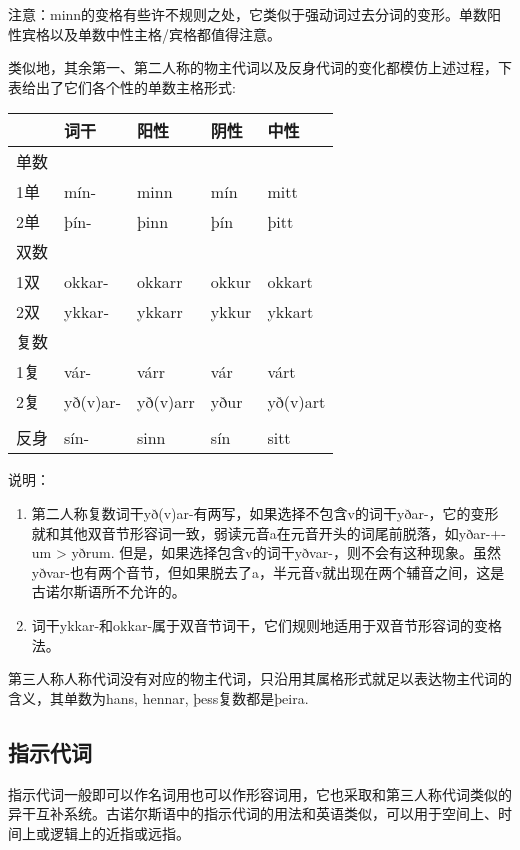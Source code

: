 注意：minn的变格有些许不规则之处，它类似于强动词过去分词的变形。单数阳性宾格以及单数中性主格/宾格都值得注意。

类似地，其余第一、第二人称的物主代词以及反身代词的变化都模仿上述过程，下表给出了它们各个性的单数主格形式:

\begin{longtable}{lllll}
\toprule
 & 词干 & 阳性 & 阴性 & 中性 \\
\midrule
\endhead
\bottomrule
\endfoot
单数 & & & & \\
1单 & mín- & minn & mín & mitt \\
2单 & þín- & þinn & þín & þitt \\
双数 & & & & \\
1双 & okkar- & okkarr & okkur & okkart \\
2双 & ykkar- & ykkarr & ykkur & ykkart \\
复数 & & & & \\
1复 & vár- & várr & vár & várt \\
2复 & yð(v)ar- & yð(v)arr & yður & yð(v)art \\
& & & & \\
反身 & sín- & sinn & sín & sitt \\
\end{longtable}

说明：

\begin{enumerate}
\def\labelenumi{\arabic{enumi})}
\item
  第二人称复数词干yð(v)ar-有两写，如果选择不包含v的词干yðar-，它的变形就和其他双音节形容词一致，弱读元音a在元音开头的词尾前脱落，如yðar-+-um
  \textgreater{} yðrum.
  但是，如果选择包含v的词干yðvar-，则不会有这种现象。虽然yðvar-也有两个音节，但如果脱去了a，半元音v就出现在两个辅音之间，这是古诺尔斯语所不允许的。
\item
  词干ykkar-和okkar-属于双音节词干，它们规则地适用于双音节形容词的变格法。
\end{enumerate}

第三人称人称代词没有对应的物主代词，只沿用其属格形式就足以表达物主代词的含义，其单数为hans,
hennar, þess复数都是þeira.

\subsection{指示代词}\label{ux6307ux793aux4ee3ux8bcd}

指示代词一般即可以作名词用也可以作形容词用，它也采取和第三人称代词类似的异干互补系统。古诺尔斯语中的指示代词的用法和英语类似，可以用于空间上、时间上或逻辑上的近指或远指。

